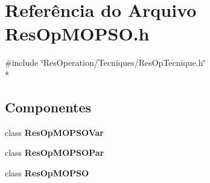 \section{Referência do Arquivo Res\+Op\+M\+O\+P\+S\+O.\+h}
\label{_tecniques_2_m_o_p_s_o_2_res_op_m_o_p_s_o_8h}
{\ttfamily \#include \char`\"{}Res\+Operation/\+Tecniques/\+Res\+Op\+Tecnique.\+h\char`\"{}}\\*
\subsection*{Componentes}
\begin{DoxyCompactItemize}
\item 
class {\bf Res\+Op\+M\+O\+P\+S\+O\+Var}
\item 
class {\bf Res\+Op\+M\+O\+P\+S\+O\+Par}
\item 
class {\bf Res\+Op\+M\+O\+P\+SO}
\end{DoxyCompactItemize}
